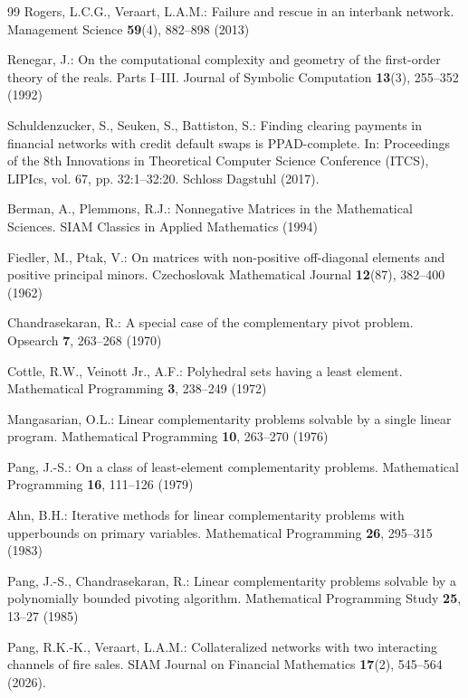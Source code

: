 \documentclass{llncs}
\begin{document}
\begin{thebibliography}{99}
Rogers, L.C.G., Veraart, L.A.M.:
Failure and rescue in an interbank network.
Management Science \textbf{59}(4), 882--898 (2013)

Renegar, J.:
On the computational complexity and geometry of the first-order theory of the reals. Parts I--III.
Journal of Symbolic Computation \textbf{13}(3), 255--352 (1992)

Schuldenzucker, S., Seuken, S., Battiston, S.:
Finding clearing payments in financial networks with credit default swaps is PPAD-complete.
In: Proceedings of the 8th Innovations in Theoretical Computer Science Conference (ITCS), LIPIcs, vol. 67, pp. 32:1--32:20. Schloss Dagstuhl (2017). 

Berman, A., Plemmons, R.J.:
Nonnegative Matrices in the Mathematical Sciences.
SIAM Classics in Applied Mathematics (1994)

Fiedler, M., Ptak, V.:
On matrices with non-positive off-diagonal elements and positive principal minors.
Czechoslovak Mathematical Journal \textbf{12}(87), 382--400 (1962)

Chandrasekaran, R.:
A special case of the complementary pivot problem.
Opsearch \textbf{7}, 263--268 (1970)

Cottle, R.W., Veinott Jr., A.F.:
Polyhedral sets having a least element.
Mathematical Programming \textbf{3}, 238--249 (1972)

Mangasarian, O.L.:
Linear complementarity problems solvable by a single linear program.
Mathematical Programming \textbf{10}, 263--270 (1976)

Pang, J.-S.:
On a class of least-element complementarity problems.
Mathematical Programming \textbf{16}, 111--126 (1979)

Ahn, B.H.:
Iterative methods for linear complementarity problems with upperbounds on primary variables.
Mathematical Programming \textbf{26}, 295--315 (1983)

Pang, J.-S., Chandrasekaran, R.:
Linear complementarity problems solvable by a polynomially bounded pivoting algorithm.
Mathematical Programming Study \textbf{25}, 13--27 (1985)

Pang, R.K.-K., Veraart, L.A.M.:
Collateralized networks with two interacting channels of fire sales.
SIAM Journal on Financial Mathematics \textbf{17}(2), 545--564 (2026).


\end{thebibliography}
\end{document}
